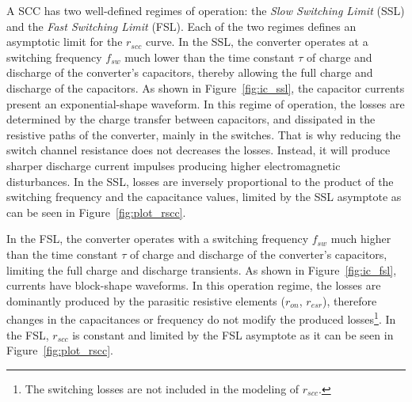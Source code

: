 A SCC has two well-defined regimes of operation: the \emph{Slow Switching Limit} (SSL) and the \emph{Fast Switching Limit} (FSL). Each of the two regimes defines an asymptotic limit for the $r_{scc}$ curve. In the SSL, the converter operates at a switching frequency $f_{sw}$ much lower than the time constant $\tau$ of charge and discharge of the converter's capacitors, thereby allowing the full charge and discharge of the capacitors. As shown in Figure~\ref{fig:ic_ssl}, the capacitor currents present an exponential-shape waveform. In this regime of operation, the losses are determined by the charge transfer between capacitors, and dissipated in the resistive paths of the converter, mainly in the switches. That is why reducing the switch channel resistance does not decreases the losses. Instead, it will produce sharper discharge current impulses producing higher electromagnetic disturbances. In the SSL, losses are inversely proportional to the product of the switching frequency and the capacitance values, limited by the SSL asymptote as can be seen in Figure~\ref{fig:plot_rscc}.

In the FSL, the converter operates with a switching frequency $f_{sw}$ much higher than the time constant $\tau$ of charge and discharge of the converter's capacitors, limiting the full charge and discharge transients. As shown in Figure~\ref{fig:ic_fsl}, currents have block-shape waveforms. In this operation regime, the losses are dominantly produced by the parasitic resistive elements ($r_{on}$, $r_{esr}$), therefore changes in the capacitances or frequency do not modify the produced losses\footnote{The switching losses are not included in the modeling of $r_{scc}$. }. In the FSL, $r_{scc}$ is constant and limited by the FSL asymptote as it can be seen in Figure~\ref{fig:plot_rscc}.

